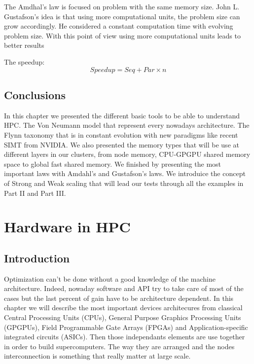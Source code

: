 The Amdhal's law is focused on problem with the same memory size. 
John L. Gustafson's idea is that using more computational units, the problem size can grow accordingly. 
He considered a constant computation time with evolving problem size. 
With this point of view using more computational units leads to better results 

The speedup:
\begin{equation}
Speedup = Seq + Par \times n
\end{equation}

\section{Conclusions}

In this chapter we presented the different basic tools to be able to understand HPC. 
The Von Neumann model that represent every nowadays architecture. 
The Flynn taxonomy that is in constant evolution with new paradigms like recent SIMT from NVIDIA. 
We also presented the memory types that will be use at different layers in our clusters, from node memory, CPU-GPGPU shared memory space to global fast shared memory. 
We finished by presenting the most important laws with Amdahl's and Gustafson's laws.
We introduice the concept of Strong and Weak scaling that will lead our tests through all the examples in Part II and Part III. 


\chapter{Hardware in HPC}

\section{Introduction}

Optimization can't be done without a good knowledge of the machine architecture. 
Indeed, nowaday software and API try to take care of most of the cases but the last percent of gain have to be architecture dependent. 
In this chapter we will describe the most important devices architecures from classical Central Processing Units (CPUs), General Purpose Graphics Processing Units (GPGPUs), Field Programmable Gate Arrays (FPGAs) and Application-specific integrated circuits (ASICs).
Then those independants elements are use together in order to build supercomputers. 
The way they are arranged and the nodes interconnection is something that really matter at large scale.  


